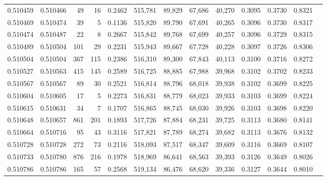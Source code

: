 \begin{tabular}{rrrrrrrrrrrrr}
0.510459 & 0.510466 &    49 &    16 &                                     0.2462 & 515,781 &  89,829 &  67,686 &  40,270 & 0.3095 & 0.3730 & 0.8321 \\
0.510469 & 0.510474 &    39 &     5 &                                     0.1136 & 515,820 &  89,790 &  67,691 &  40,265 & 0.3096 & 0.3730 & 0.8317 \\
0.510474 & 0.510487 &    22 &     8 &                                     0.2667 & 515,842 &  89,768 &  67,699 &  40,257 & 0.3096 & 0.3729 & 0.8315 \\
0.510489 & 0.510504 &   101 &    29 &                                     0.2231 & 515,943 &  89,667 &  67,728 &  40,228 & 0.3097 & 0.3726 & 0.8306 \\
0.510504 & 0.510504 &   367 &   115 &                                     0.2386 & 516,310 &  89,300 &  67,843 &  40,113 & 0.3100 & 0.3716 & 0.8272 \\
0.510527 & 0.510563 &   415 &   145 &                                     0.2589 & 516,725 &  88,885 &  67,988 &  39,968 & 0.3102 & 0.3702 & 0.8233 \\
0.510567 & 0.510567 &    89 &    30 &                                     0.2521 & 516,814 &  88,796 &  68,018 &  39,938 & 0.3102 & 0.3699 & 0.8225 \\
0.510604 & 0.510605 &    17 &     5 &                                     0.2273 & 516,831 &  88,779 &  68,023 &  39,933 & 0.3103 & 0.3699 & 0.8224 \\
0.510615 & 0.510631 &    34 &     7 &                                     0.1707 & 516,865 &  88,745 &  68,030 &  39,926 & 0.3103 & 0.3698 & 0.8220 \\
0.510648 & 0.510657 &   861 &   201 &                                     0.1893 & 517,726 &  87,884 &  68,231 &  39,725 & 0.3113 & 0.3680 & 0.8141 \\
0.510664 & 0.510716 &    95 &    43 &                                     0.3116 & 517,821 &  87,789 &  68,274 &  39,682 & 0.3113 & 0.3676 & 0.8132 \\
0.510728 & 0.510728 &   272 &    73 &                                     0.2116 & 518,093 &  87,517 &  68,347 &  39,609 & 0.3116 & 0.3669 & 0.8107 \\
0.510733 & 0.510780 &   876 &   216 &                                     0.1978 & 518,969 &  86,641 &  68,563 &  39,393 & 0.3126 & 0.3649 & 0.8026 \\
0.510786 & 0.510786 &   165 &    57 &                                     0.2568 & 519,134 &  86,476 &  68,620 &  39,336 & 0.3127 & 0.3644 & 0.8010 \\

\end{tabular}
